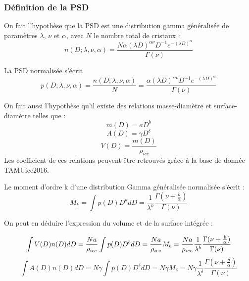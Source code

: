 \subsubsection{Définition de la PSD}

On fait l'hypothèse que la PSD est une distribution gamma généralisée de paramètres $\lambda$, $\nu$ et $\alpha$, avec $N$ le nombre total de cristaux :
\begin{equation}
    n(D;\lambda, \nu,\alpha) = \frac{N \alpha (\lambda D)^{\alpha \nu}D^{-1}e^{-(\lambda D)^\alpha}}{ \Gamma(\nu)}
\end{equation}

La PSD normalisée s'écrit
\begin{equation}
p(D;\lambda, \nu,\alpha) = \frac{n(D;\lambda, \nu,\alpha)}{N} = \frac{ \alpha (\lambda D)^{\alpha \nu}D^{-1}e^{-(\lambda D)^\alpha}}{ \Gamma(\nu)}
\end{equation}

On fait aussi l'hypothèse qu'il existe des relations masse-diamètre et surface-diamètre telles que : 
\begin{equation}
    m(D) = aD^b 
\end{equation}
\begin{equation}
    A(D) = \gamma D^\delta
\end{equation}
\begin{equation}
    V(D) = \frac{m(D)}{\rho_{ice}}
\end{equation}
Les coefficient de ces relations peuvent être retrouvés grâce à la base de donnée TAMUice2016.

Le moment d'ordre k d'une distribution Gamma généralisée normalisée s'écrit :
\begin{equation}
M_k = \int p(D) D^k dD = \frac{1}{\lambda^k} \frac{\Gamma(\nu + \frac{k}{\alpha})}{\Gamma(\nu)}
\end{equation}

On peut en déduire l'expression du volume et de la surface intégrée : 

\begin{equation}
    \int V(D)n(D)dD = \frac{N a}{\rho_{ice}}\int p(D) D^b dD = \\
    \frac{N a}{\rho_{ice}} M_b =\\
    \frac{N a}{\rho_{ice}} \frac{1}{\lambda^b} \frac{\Gamma(\nu + \frac{b}{\alpha})}{\Gamma(\nu)}
\end{equation}
\begin{equation}
    \int A(D)n(D)dD = N \gamma \int p(D) D^\delta dD =  N \gamma M_\delta = N \gamma \frac{1}{\lambda^\delta} \frac{\Gamma(\nu + \frac{\delta}{\alpha})}{\Gamma(\nu)}
\end{equation}

